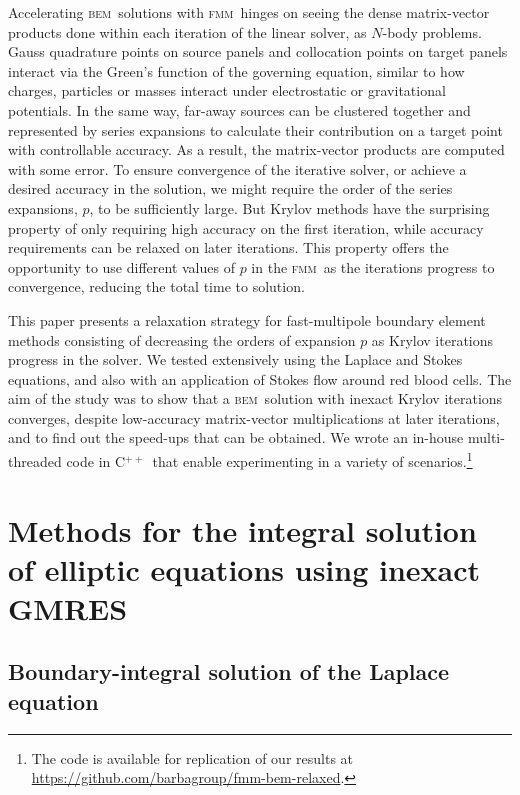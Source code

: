 \documentclass[final,3p,times]{elsarticle}
\newcommand{\bem}{\textsc{bem}\xspace}
\newcommand{\fmm}{\textsc{fmm}\xspace}
\newcommand{\cpp}{C$^{++}$}
\begin{document}
Accelerating \bem\ solutions with \fmm\ hinges on seeing the dense matrix-vector products done within each iteration of the linear solver, as $N$-body problems. Gauss quadrature points on source panels and collocation points on target panels interact via the Green's function of the governing equation, similar to how charges, particles or masses interact under electrostatic or gravitational potentials. In the same way, far-away sources can be clustered together and represented by series expansions to calculate their contribution on a target point with controllable accuracy. As a result, the matrix-vector products are computed with some error. To ensure convergence of the iterative solver, or achieve a desired accuracy in the solution, we might require the order of the series expansions, $p$, to be sufficiently large. But Krylov methods have the surprising property of only requiring high accuracy on the first iteration, while accuracy requirements can be relaxed on later iterations. This property offers the opportunity to use different values of $p$ in the \fmm\ as the iterations progress to convergence, reducing the total time to solution.

This paper presents a relaxation strategy for fast-multipole boundary element methods consisting of decreasing the orders of expansion $p$ as Krylov iterations progress in the solver. We tested extensively using the Laplace and Stokes equations, and also with an application of Stokes flow around red blood cells. The aim of the study was to show that a \bem\ solution with inexact Krylov iterations converges, despite low-accuracy matrix-vector multiplications at later iterations, and to find out the speed-ups that can be obtained. We wrote an in-house  multi-threaded code in \cpp\ that enable experimenting in a variety of scenarios.\footnote{The code is available for replication of our results at \href{https://github.com/barbagroup/fmm-bem-relaxed}{https://github.com/barbagroup/fmm-bem-relaxed}.}

\section{Methods for the integral solution of elliptic equations using inexact {\small GMRES}}

\subsection{Boundary-integral solution of the Laplace equation}
\end{document}
